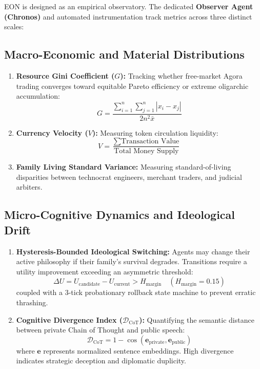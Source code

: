 \documentclass[11pt,a4paper]{article}
\begin{document}
EON is designed as an empirical observatory. The dedicated \textbf{Observer Agent (Chronos)} and automated instrumentation track metrics across three distinct scales:

\subsection{Macro-Economic and Material Distributions}
\begin{enumerate}[leftmargin=*]
    \item \textbf{Resource Gini Coefficient ($G$):} Tracking whether free-market Agora trading converges toward equitable Pareto efficiency or extreme oligarchic accumulation:
    \begin{equation}
    G = \frac{\sum_{i=1}^n \sum_{j=1}^n |x_i - x_j|}{2n^2 \bar{x}}
    \end{equation}
    \item \textbf{Currency Velocity ($V$):} Measuring token circulation liquidity:
    \begin{equation}
    V = \frac{\sum \text{Transaction Value}}{\text{Total Money Supply}}
    \end{equation}
    \item \textbf{Family Living Standard Variance:} Measuring standard-of-living disparities between technocrat engineers, merchant traders, and judicial arbiters.
\end{enumerate}

\subsection{Micro-Cognitive Dynamics and Ideological Drift}
\begin{enumerate}[leftmargin=*]
    \item \textbf{Hysteresis-Bounded Ideological Switching:} Agents may change their active philosophy if their family's survival degrades. Transitions require a utility improvement exceeding an asymmetric threshold:
    \begin{equation}
    \Delta U = U_{\text{candidate}} - U_{\text{current}} > H_{\text{margin}} \quad (H_{\text{margin}} = 0.15)
    \end{equation}
    coupled with a 3-tick probationary rollback state machine to prevent erratic thrashing.
    \item \textbf{Cognitive Divergence Index ($\mathcal{D}_{\text{CoT}}$):} Quantifying the semantic distance between private Chain of Thought and public speech:
    \begin{equation}
    \mathcal{D}_{\text{CoT}} = 1 - \cos(\mathbf{e}_{\text{private}}, \mathbf{e}_{\text{public}})
    \end{equation}
    where $\mathbf{e}$ represents normalized sentence embeddings. High divergence indicates strategic deception and diplomatic duplicity.
\end{enumerate}
\end{document}
